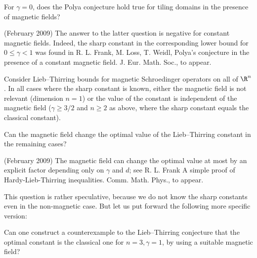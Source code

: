 \documentclass[12pt,letterpaper, reqno]{amsart}
\begin{document}
\begin{problemblock}
\begin{problem}[2.58]
For $\gamma=0$, does the Polya conjecture hold true for tiling domains in the
presence of magnetic fields?
\end{problem}


\begin{remark}
(February 2009) The answer to the latter question is negative for
constant magnetic fields. Indeed, the sharp constant in the corresponding
lower bound for $0\leq\gamma<1$ was found in R. L. Frank, M. Loss,
T. Weidl, Polya's conjecture in the presence of a constant
magnetic field. J. Eur. Math. Soc., to appear.
\end{remark}

\end{problemblock}


\begin{problemblock} 
Consider Lieb--Thirring bounds for magnetic
Schroedinger operators on all of $\R^n$. In all cases where the
sharp constant is known, either the magnetic field is not relevant
(dimension $n=1$) or the value of the constant is independent of the
magnetic field ($\gamma\geq 3/2$ and $n\geq 2$ as above, where the
sharp constant equals the classical constant).

\begin{problem}[2.6]  
Can the magnetic field change the optimal value of the
Lieb--Thirring constant in the remaining cases?
\end{problem}

\begin{remark}
(February 2009) The magnetic field can change the optimal
value at most by an explicit factor depending only on $\gamma$ and
$d$; see R. L. Frank A simple proof of Hardy-Lieb-Thirring
inequalities. Comm. Math. Phys., to appear.
\end{remark}

\begin{remark}
This question is rather speculative, because we do not know the
sharp constants even in the non-magnetic case. But let us put
forward the following more specific version:
\end{remark}
\end{problemblock}

\begin{problemblock}
\begin{problem}[2.63]
Can one construct a counterexample to the Lieb--Thirring conjecture
that the optimal constant is the classical one for $n=3, \gamma=1$,
by using a suitable magnetic field?
\end{problem}

\end{problemblock}
\end{document}
